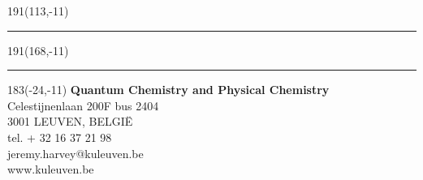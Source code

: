\documentclass[12pt,a4paper,oneside]{book}
\begin{document}






\printbibliography

%


\appendix





\newpage
\thispagestyle{empty}
\sffamily
%
\begin{textblock}{191}(113,-11)
{\color{blueline}\rule{160pt}{5.5pt}}
\end{textblock}
%
\begin{textblock}{191}(168,-11)
{\color{blueline}\rule{5.5pt}{59pt}}
\end{textblock}
%
\begin{textblock}{183}(-24,-11)
\textblockcolour{}
\flushright
\fontsize{7}{7.5}\selectfont
\textbf{Quantum Chemistry and Physical Chemistry}\\
Celestijnenlaan 200F bus 2404\\
3001 LEUVEN, BELGI\"{E}\\
tel. + 32 16 37 21 98\\
jeremy.harvey@kuleuven.be\\
www.kuleuven.be\\
\end{textblock}
%
\end{document}
